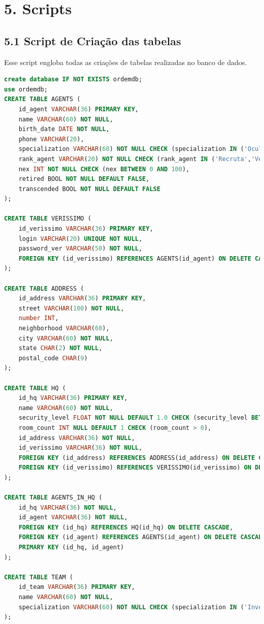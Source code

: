 \documentclass[12pt,a4paper]{report}
\begin{document}
\chapter{5. Scripts}
\section{5.1 Script de Criação das tabelas}
Esse script engloba todas as criações de tabelas realizadas no banco de dados.
\begin{lstlisting}[language=SQL, caption=ordemdb.sql]
create database IF NOT EXISTS ordemdb;
use ordemdb;
CREATE TABLE AGENTS (
    id_agent VARCHAR(36) PRIMARY KEY,
    name VARCHAR(60) NOT NULL,
    birth_date DATE NOT NULL,
    phone VARCHAR(20),
    specialization VARCHAR(60) NOT NULL CHECK (specialization IN ('Ocultista','Especialista','Combatente')),
    rank_agent VARCHAR(20) NOT NULL CHECK (rank_agent IN ('Recruta','Veterano','Elite')),
    nex INT NOT NULL CHECK (nex BETWEEN 0 AND 100),
    retired BOOL NOT NULL DEFAULT FALSE,
    transcended BOOL NOT NULL DEFAULT FALSE
);

CREATE TABLE VERISSIMO (
    id_verissimo VARCHAR(36) PRIMARY KEY,
    login VARCHAR(20) UNIQUE NOT NULL,
    password_ver VARCHAR(50) NOT NULL,
    FOREIGN KEY (id_verissimo) REFERENCES AGENTS(id_agent) ON DELETE CASCADE
);

CREATE TABLE ADDRESS (
    id_address VARCHAR(36) PRIMARY KEY,
    street VARCHAR(100) NOT NULL,
    number INT,
    neighborhood VARCHAR(60),
    city VARCHAR(60) NOT NULL,
    state CHAR(2) NOT NULL,
    postal_code CHAR(9)
);

CREATE TABLE HQ (
    id_hq VARCHAR(36) PRIMARY KEY,
    name VARCHAR(60) NOT NULL,
    security_level FLOAT NOT NULL DEFAULT 1.0 CHECK (security_level BETWEEN 0.0 AND 10.0),
    room_count INT NULL DEFAULT 1 CHECK (room_count > 0),
    id_address VARCHAR(36) NOT NULL,
    id_verissimo VARCHAR(36) NOT NULL,
    FOREIGN KEY (id_address) REFERENCES ADDRESS(id_address) ON DELETE CASCADE,
    FOREIGN KEY (id_verissimo) REFERENCES VERISSIMO(id_verissimo) ON DELETE CASCADE
);

CREATE TABLE AGENTS_IN_HQ (
    id_hq VARCHAR(36) NOT NULL,
    id_agent VARCHAR(36) NOT NULL,
    FOREIGN KEY (id_hq) REFERENCES HQ(id_hq) ON DELETE CASCADE,
    FOREIGN KEY (id_agent) REFERENCES AGENTS(id_agent) ON DELETE CASCADE,
    PRIMARY KEY (id_hq, id_agent)
);

CREATE TABLE TEAM (
    id_team VARCHAR(36) PRIMARY KEY,
    name VARCHAR(60) NOT NULL,
    specialization VARCHAR(60) NOT NULL CHECK (specialization IN ('Investigação','Combate','Suporte'))
);


\end{lstlisting}
\end{document}
